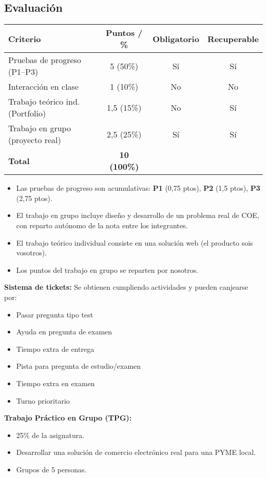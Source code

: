 \documentclass[11pt,a4paper]{article}
\begin{document}
	\subsection*{Evaluación}
	\begin{center}
		\renewcommand{\arraystretch}{1.4}
		\begin{tabular}{|p{5.5cm}|c|c|c|}
			\hline
			\textbf{Criterio} & \textbf{Puntos / \%} & \textbf{Obligatorio} & \textbf{Recuperable} \\
			\hline
			Pruebas de progreso (P1--P3) & 5 (50\%) & Sí & Sí \\
			Interacción en clase & 1 (10\%) & No & No \\
			Trabajo teórico ind. (Portfolio) & 1,5 (15\%) & No & Sí \\
			Trabajo en grupo (proyecto real) & 2,5 (25\%) & Sí & Sí \\
			\hline
			\textbf{Total} & \textbf{10 (100\%)} & & \\
			\hline
		\end{tabular}
	\end{center}

	\begin{NotaBox}
		\begin{itemize}[leftmargin=1.5em]
			\item Las pruebas de progreso son acumulativas: \textbf{P1} (0,75 ptos), \textbf{P2} (1,5 ptos), \textbf{P3} (2,75 ptos).
			\item El trabajo en grupo incluye diseño y desarrollo de un problema real de COE, con reparto autónomo de la nota entre los integrantes.
			\item El trabajo teórico individual consiste en una solución web (el producto sois vosotros).
			\item Los puntos del trabajo en grupo se reparten por nosotros.
		\end{itemize}
	\end{NotaBox}

	\begin{RecordatorioBox}
		\textbf{Sistema de tickets:} Se obtienen cumpliendo actividades y pueden canjearse por:
		\begin{itemize}[leftmargin=1.5em]
			\item Pasar pregunta tipo test
			\item Ayuda en pregunta de examen
			\item Tiempo extra de entrega
			\item Pista para pregunta de estudio/examen
			\item Tiempo extra en examen
			\item Turno prioritario
		\end{itemize}
	\end{RecordatorioBox}

	\begin{ObjetivosBox}
		\textbf{Trabajo Práctico en Grupo (TPG):} \\
		\begin{itemize}[leftmargin=1.5em]
			\item 25\% de la asignatura.
			\item Desarrollar una solución de comercio electrónico real para una PYME local.
			\item Grupos de 5 personas.
		\end{itemize}
	\end{ObjetivosBox}
\end{document}
